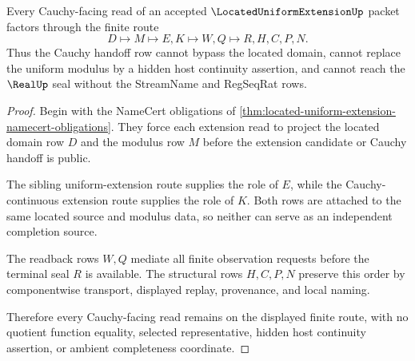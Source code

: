 \begin{theorem}
\label{thm:located-uniform-extension-cauchy-handoff}
Every Cauchy-facing read of an accepted $\LocatedUniformExtensionUp$ packet factors through the finite route
$$
D \longmapsto M \longmapsto E,K \longmapsto W,Q \longmapsto R,H,C,P,N .
$$
Thus the Cauchy handoff row cannot bypass the located domain, cannot replace the uniform modulus by a hidden host continuity assertion, and cannot reach the $\RealUp$ seal without the StreamName and RegSeqRat rows.
\end{theorem}
\begin{proof}
Begin with the NameCert obligations of \autoref{thm:located-uniform-extension-namecert-obligations}. They force each extension read to project the located domain row $D$ and the modulus row $M$ before the extension candidate or Cauchy handoff is public.

The sibling uniform-extension route supplies the role of $E$, while the Cauchy-continuous extension route supplies the role of $K$. Both rows are attached to the same located source and modulus data, so neither can serve as an independent completion source.

The readback rows $W,Q$ mediate all finite observation requests before the terminal seal $R$ is available. The structural rows $H,C,P,N$ preserve this order by componentwise transport, displayed replay, provenance, and local naming.

Therefore every Cauchy-facing read remains on the displayed finite route, with no quotient function equality, selected representative, hidden host continuity assertion, or ambient completeness coordinate.
\end{proof}


\begin{closurestatus}{\LocatedUniformExtensionUp}
  \theoryclosure{\seedClosure}
  \formalstatus{\unformalizedV}
\end{closurestatus}
